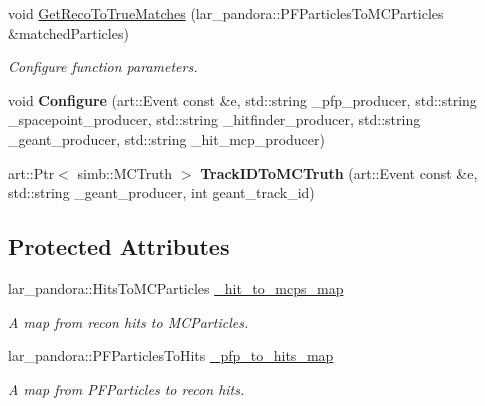 \begin{DoxyCompactItemize}
\item 
void \hyperlink{classlee_1_1PandoraInterfaceHelper_aedec8759b64e578d4d27e4dd57bc2111}{Get\-Reco\-To\-True\-Matches} (lar\-\_\-pandora\-::\-P\-F\-Particles\-To\-M\-C\-Particles \&matched\-Particles)
\begin{DoxyCompactList}\small\item\em Configure function parameters. \end{DoxyCompactList}\item 
\hypertarget{classlee_1_1PandoraInterfaceHelper_acea920f6926b69221a6a04d17e38cbf9}{void {\bfseries Configure} (art\-::\-Event const \&e, std\-::string \-\_\-pfp\-\_\-producer, std\-::string \-\_\-spacepoint\-\_\-producer, std\-::string \-\_\-hitfinder\-\_\-producer, std\-::string \-\_\-geant\-\_\-producer, std\-::string \-\_\-hit\-\_\-mcp\-\_\-producer)}\label{classlee_1_1PandoraInterfaceHelper_acea920f6926b69221a6a04d17e38cbf9}

\item 
\hypertarget{classlee_1_1PandoraInterfaceHelper_aab1841058478f2ef51067eeb588d1711}{art\-::\-Ptr$<$ simb\-::\-M\-C\-Truth $>$ {\bfseries Track\-I\-D\-To\-M\-C\-Truth} (art\-::\-Event const \&e, std\-::string \-\_\-geant\-\_\-producer, int geant\-\_\-track\-\_\-id)}\label{classlee_1_1PandoraInterfaceHelper_aab1841058478f2ef51067eeb588d1711}

\end{DoxyCompactItemize}
\subsection*{Protected Attributes}
\begin{DoxyCompactItemize}
\item 
\hypertarget{classlee_1_1PandoraInterfaceHelper_add430a976fa40632e14eb1688cdd785b}{lar\-\_\-pandora\-::\-Hits\-To\-M\-C\-Particles \hyperlink{classlee_1_1PandoraInterfaceHelper_add430a976fa40632e14eb1688cdd785b}{\-\_\-hit\-\_\-to\-\_\-mcps\-\_\-map}}\label{classlee_1_1PandoraInterfaceHelper_add430a976fa40632e14eb1688cdd785b}

\begin{DoxyCompactList}\small\item\em A map from recon hits to M\-C\-Particles. \end{DoxyCompactList}\item 
\hypertarget{classlee_1_1PandoraInterfaceHelper_ae19df94cb2c29dc2735bf7436c5ccf63}{lar\-\_\-pandora\-::\-P\-F\-Particles\-To\-Hits \hyperlink{classlee_1_1PandoraInterfaceHelper_ae19df94cb2c29dc2735bf7436c5ccf63}{\-\_\-pfp\-\_\-to\-\_\-hits\-\_\-map}}\label{classlee_1_1PandoraInterfaceHelper_ae19df94cb2c29dc2735bf7436c5ccf63}

\begin{DoxyCompactList}\small\item\em A map from P\-F\-Particles to recon hits. \end{DoxyCompactList}\end{DoxyCompactItemize}


